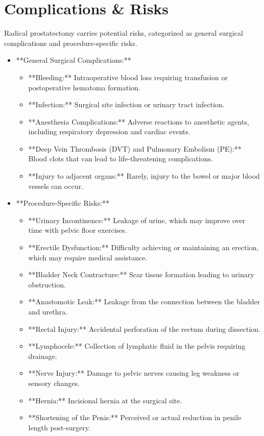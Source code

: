 \section*{Complications \& Risks}
Radical prostatectomy carries potential risks, categorized as general surgical complications and procedure-specific risks.

\begin{itemize}
  \item **General Surgical Complications:**
    \begin{itemize}
      \item **Bleeding:** Intraoperative blood loss requiring transfusion or postoperative hematoma formation.
      \item **Infection:** Surgical site infection or urinary tract infection.
      \item **Anesthesia Complications:** Adverse reactions to anesthetic agents, including respiratory depression and cardiac events.
      \item **Deep Vein Thrombosis (DVT) and Pulmonary Embolism (PE):** Blood clots that can lead to life-threatening complications.
      \item **Injury to adjacent organs:** Rarely, injury to the bowel or major blood vessels can occur.
    \end{itemize}
  
  \item **Procedure-Specific Risks:**
    \begin{itemize}
      \item **Urinary Incontinence:** Leakage of urine, which may improve over time with pelvic floor exercises.
      \item **Erectile Dysfunction:** Difficulty achieving or maintaining an erection, which may require medical assistance.
      \item **Bladder Neck Contracture:** Scar tissue formation leading to urinary obstruction.
      \item **Anastomotic Leak:** Leakage from the connection between the bladder and urethra.
      \item **Rectal Injury:** Accidental perforation of the rectum during dissection.
      \item **Lymphocele:** Collection of lymphatic fluid in the pelvis requiring drainage.
      \item **Nerve Injury:** Damage to pelvic nerves causing leg weakness or sensory changes.
      \item **Hernia:** Incisional hernia at the surgical site.
      \item **Shortening of the Penis:** Perceived or actual reduction in penile length post-surgery.
    \end{itemize}
\end{itemize}

